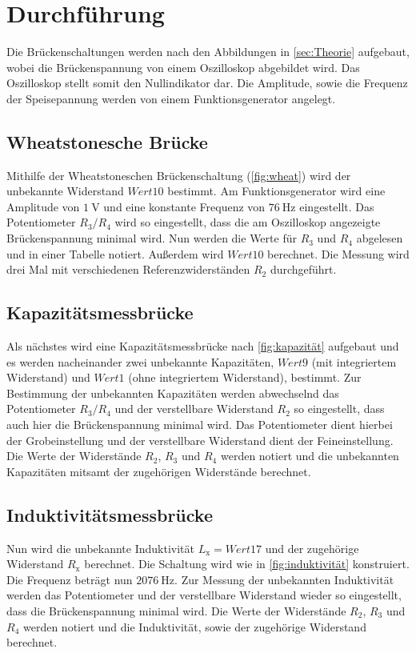 \section{Durchführung}
\label{sec:Durchführung}

Die Brückenschaltungen werden nach den Abbildungen in \autoref{sec:Theorie} aufgebaut, wobei die Brückenspannung von einem Oszilloskop abgebildet wird.
Das Oszilloskop stellt somit den Nullindikator dar. Die Amplitude, sowie die Frequenz der Speisepannung werden von einem Funktionsgenerator angelegt.

\subsection{Wheatstonesche Brücke}
\label{subsec:wheatstone_durch}
Mithilfe der Wheatstoneschen Brückenschaltung (\autoref{fig:wheat}) wird der unbekannte Widerstand $Wert 10$ bestimmt.
Am Funktionsgenerator wird eine Amplitude von $\qty{1}{\volt}$ und eine konstante Frequenz von $\qty{76}{\hertz}$ eingestellt.
Das Potentiometer $R_3/R_4$ wird so eingestellt, dass die am Oszilloskop angezeigte Brückenspannung
minimal wird. Nun werden die Werte für $R_3$ und $R_4$ abgelesen und in einer Tabelle notiert. Außerdem wird $Wert 10$ berechnet.
Die Messung wird drei Mal mit verschiedenen Referenzwiderständen $R_2$ durchgeführt.

\subsection{Kapazitätsmessbrücke}
\label{subsec:kapazitäts_durch}
Als nächstes wird eine Kapazitätsmessbrücke nach \autoref{fig:kapazität} aufgebaut und es werden nacheinander zwei unbekannte Kapazitäten, $Wert 9$ (mit integriertem Widerstand) und $Wert 1$ (ohne integriertem Widerstand),
bestimmt. Zur Bestimmung der unbekannten Kapazitäten werden abwechselnd das Potentiometer $R_3/R_4$ und der verstellbare Widerstand $R_2$ so eingestellt,
dass auch hier die Brückenspannung minimal wird. Das Potentiometer dient hierbei der Grobeinstellung und der verstellbare Widerstand dient der Feineinstellung.
Die Werte der Widerstände $R_2$, $R_3$ und $R_4$ werden notiert und die unbekannten Kapazitäten mitsamt der zugehörigen Widerstände berechnet.

\subsection{Induktivitätsmessbrücke}
\label{subsec:induktivität_durch}
Nun wird die unbekannte Induktivität $L_{\text{x}}=Wert 17$ und der zugehörige Widerstand $R_{\text{x}}$ berechnet. Die Schaltung wird wie in \autoref{fig:induktivität} konstruiert.
Die Frequenz beträgt nun $\qty{2076}{\hertz}$.
Zur Messung der unbekannten Induktivität werden das Potentiometer und der verstellbare Widerstand wieder so eingestellt, dass die Brückenspannung minimal wird.
Die Werte der Widerstände $R_2$, $R_3$ und $R_4$ werden notiert und die Induktivität, sowie der zugehörige Widerstand berechnet.

